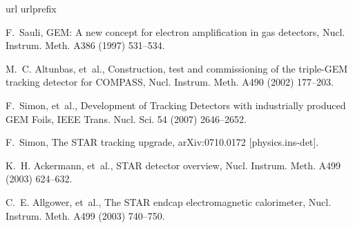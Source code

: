 \documentclass[5p,twocolumn,times,number]{elsarticle}
\begin{document}
\begin{thebibliography}{10}
\expandafter\ifx\csname url\endcsname\relax
  \def\url#1{\texttt{#1}}\fi
\expandafter\ifx\csname urlprefix\endcsname\relax\def\urlprefix{URL }\fi

F.~Sauli, {GEM}: A new concept for electron amplification in gas detectors,
  Nucl. Instrum. Meth. A386 (1997) 531--534.

M.~C. Altunbas, et~al., Construction, test and commissioning of the
  triple-{GEM} tracking detector for {COMPASS}, Nucl. Instrum. Meth. A490
  (2002) 177--203.

F.~Simon, et~al., {Development of Tracking Detectors with industrially produced
  GEM Foils}, IEEE Trans. Nucl. Sci. 54 (2007) 2646--2652.

F.~Simon, The {STAR} tracking upgrade, arXiv:0710.0172 [physics.ins-det].

K.~H. Ackermann, et~al., {STAR} detector overview, Nucl. Instrum. Meth. A499
  (2003) 624--632.

C.~E. Allgower, et~al., The {STAR} endcap electromagnetic calorimeter, Nucl.
  Instrum. Meth. A499 (2003) 740--750.

\end{thebibliography}
\end{document}
